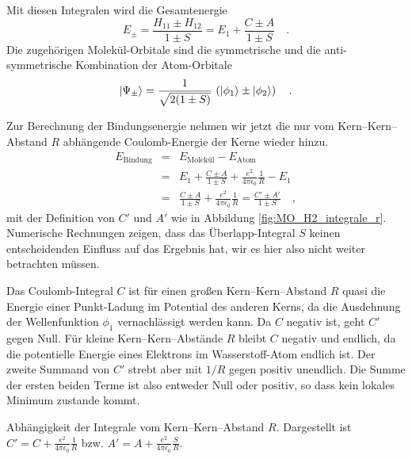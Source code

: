 Mit diesen Integralen wird die Gesamtenergie
\begin{equation}
E_\pm = \frac{H_{11} \pm H_{12}}{1 \pm S} = E_1 + \frac{C \pm A}{1 \pm S} \quad .
\end{equation}
Die zugehörigen Molekül-Orbitale sind die symmetrische und die anti-symmetrische Kombination der Atom-Orbitale
\begin{equation}
\ket{\Psi_\pm }= \frac{1}{\sqrt{2 (1 \pm  S)}} \, \left( \ket{\phi_1} \pm \ket{\phi_2} \right) \quad .
\end{equation}

Zur Berechnung der Bindungsenergie nehmen wir jetzt die nur vom Kern--Kern--Abstand $R$ abhängende Coulomb-Energie der Kerne wieder hinzu. 
%
\begin{eqnarray}
 E_\text{Bindung} &=&  E_\text{Molekül} -  E_\text{Atom} \\
  &=&   E_1 + \frac{C \pm A}{1 \pm S} + \frac{e^2}{4 \pi \epsilon_0} \frac{1}{R} - E_1 \\
   &=&\frac{C \pm A}{1 \pm S} + \frac{e^2}{4 \pi \epsilon_0} \frac{1}{R}  = \frac{C' \pm A'}{1 \pm S}  \quad , \label{eq:MO_E_bindung_h2p}
\end{eqnarray}
mit der Definition  von $C'$ und $A'$ wie in Abbildung \ref{fig:MO_H2_integrale_r}.
Numerische Rechnungen zeigen, dass das Überlapp-Integral $S$ keinen entscheidenden Einfluss auf das Ergebnis hat, wir es hier also nicht weiter betrachten müssen.

Das Coulomb-Integral $C$ ist für einen  großen Kern--Kern--Abstand $R$ quasi die Energie einer Punkt-Ladung im Potential des anderen Kerns, da die Ausdehnung der Wellenfunktion $\phi_1$ vernachlässigt werden kann. Da $C$ negativ ist, geht $C'$ gegen Null. Für kleine Kern--Kern--Abstände $R$ bleibt $C$ negativ und endlich, da die potentielle Energie eines Elektrons im Wasserstoff-Atom endlich ist. Der zweite Summand von  $C'$ strebt aber mit $1/R$ gegen positiv unendlich. Die Summe der ersten beiden Terme ist also entweder Null oder positiv, so dass kein lokales Minimum zustande kommt.



\begin{marginfigure}

\caption{Abhängigkeit der Integrale vom Kern--Kern--Abstand $R$. Dargestellt ist 
$C' = C  + \frac{e^2}{4 \pi \epsilon_0} \frac{1 }{R}$ bzw. $A' = A   + \frac{e^2}{4 \pi \epsilon_0} \frac{ S }{R}$. \label{fig:MO_H2_integrale_r}
 }
\end{marginfigure}



